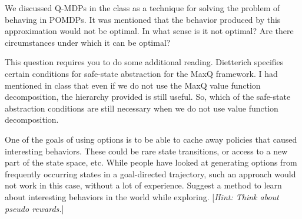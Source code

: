 \documentclass[addpoints,12pt,solution]{exam}
\begin{document}
\begin{questions}
\begin{solution}
\end{solution}

\question[4] We discussed Q-MDPs in the class as a technique for solving the problem of behaving in POMDPs. It was mentioned that the behavior produced by this approximation would not be optimal. In what sense is it not optimal? Are there circumstances under which it can be optimal?

\begin{solution}

\end{solution}

\question[3] This question requires you to do some additional reading. Dietterich specifies certain conditions for safe-state abstraction for the MaxQ framework. I had mentioned in class that even if we do not use the MaxQ value function decomposition, the hierarchy provided is still useful. So, which of the safe-state abstraction conditions are still necessary when we do not use value function decomposition.
\begin{solution}

\end{solution}

\question[4] One of the goals of using options is to be able to cache away policies that caused interesting behaviors. These could be rare state transitions, or access to a new part of the state space, etc. While people have looked at generating options from frequently occurring states in a goal-directed trajectory, such an approach would not work in this case, without a lot of experience. Suggest a method to learn about interesting behaviors in the world while exploring. [\textit{Hint: Think about pseudo rewards.}]
\begin{solution}

\end{solution}

\end{questions}
\end{document}
